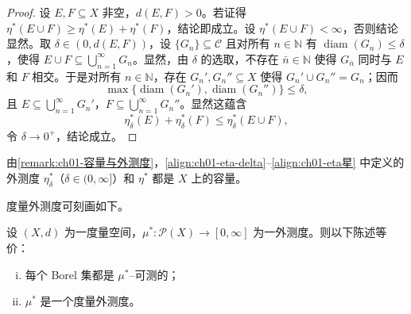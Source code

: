 \documentclass[../../main.tex]{subfiles}%
\begin{document}
\begin{proof}
设 $E,F\subseteq X$ 非空，$d(E,F)>0$。若证得 $\eta^*(E\cup F)\geqslant\eta^*(E)+\eta^*(F)$，结论即成立。设 $\eta^*(E\cup F)<\infty$，否则结论显然。取 $\delta\in(0,d(E,F))$，设 $\{G_n\}\subseteq\mathcal{C}$ 且对所有 $n\in\mathbb{N}$ 有 $\operatorname{diam}(G_n)\leqslant\delta$，使得 $E\cup F\subseteq\bigcup_{n=1}^\infty G_n$。显然，由 $\delta$ 的选取，不存在 $\bar{n}\in\mathbb{N}$ 使得 $G_{\bar{n}}$ 同时与 $E$ 和 $F$ 相交。于是对所有 $n\in\mathbb{N}$，存在 $G_n',G_n''\subseteq X$ 使得 $G_n'\cup G_n''=G_n$；因而
\[
\max\{\operatorname{diam}(G_n'),\operatorname{diam}(G_n'')\}\leqslant\delta,
\]
且 $E\subseteq\bigcup_{n=1}^\infty G_n'$，$F\subseteq\bigcup_{n=1}^\infty G_n''$。显然这蕴含
\[
\eta_\delta^*(E)+\eta_\delta^*(F)\leqslant\eta_\delta^*(E\cup F),
\]
令 $\delta\to0^+$，结论成立。
\end{proof}

\begin{remark}\label{remark:ch01-eta是容量}
由\cref{remark:ch01-容量与外测度}，\eqref{align:ch01-eta-delta}--\eqref{align:ch01-eta星} 中定义的外测度 $\eta_\delta^*$（$\delta\in(0,\infty]$）和 $\eta^*$ 都是 $X$ 上的容量。
\end{remark}

度量外测度可刻画如下。

\begin{proposition}\label{proposition:ch01-度量外测度等价}
设 $(X,d)$ 为一度量空间，$\mu^*:\mathcal{P}(X)\to[0,\infty]$ 为一外测度。则以下陈述等价：
\begin{enumerate}[(i)]
\item 每个 Borel 集都是 $\mu^*$--可测的；
\item $\mu^*$ 是一个度量外测度。
\end{enumerate}
\end{proposition}
\end{document}
